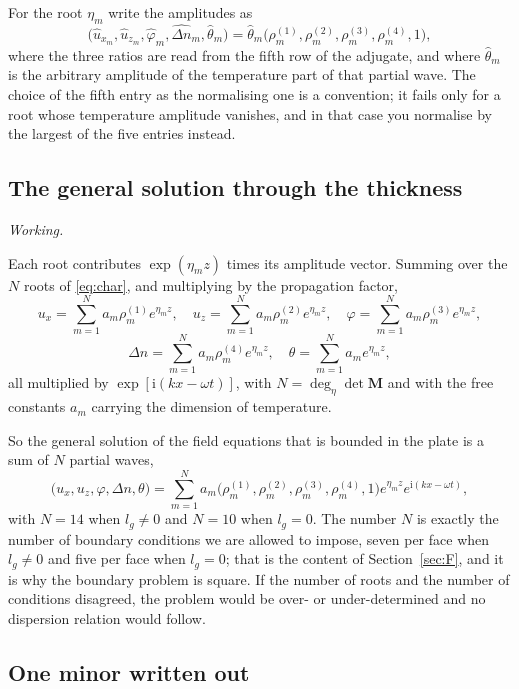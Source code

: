 \documentclass[11pt,a4paper]{article}
\newif\ifshowworked \showworkedtrue
\newenvironment{worked}{\ifshowworked\par\smallskip\noindent\textit{Working.}\par\else\setbox0\vbox\bgroup\fi}{\ifshowworked\par\smallskip\else\egroup\fi}
\newcommand{\ii}{\mathrm{i}}
\newcommand{\bx}{\hat u_x}
\newcommand{\bz}{\hat u_z}
\newcommand{\bp}{\hat\varphi}
\newcommand{\bn}{\widehat{\Delta n}}
\newcommand{\bt}{\hat\theta}
\begin{document}
\noindent For the root $\eta_m$ write the amplitudes as
\begin{equation}\label{eq:ratio}
\bigl(\bx_m,\bz_m,\bp_m,\bn_m,\bt_m\bigr)=\bt_m\bigl(\rho^{(1)}_m,\rho^{(2)}_m,\rho^{(3)}_m,\rho^{(4)}_m,1\bigr),
\end{equation}
where the three ratios are read from the fifth row of the adjugate, and where $\bt_m$ is the arbitrary
amplitude of the temperature part of that partial wave. The choice of the fifth entry as the normalising one
is a convention; it fails only for a root whose temperature amplitude vanishes, and in that case you
normalise by the largest of the five entries instead.

\subsection{The general solution through the thickness}

\begin{worked}
Each root contributes $\exp(\eta_m z)$ times its amplitude vector. Summing over the $N$ roots of
\eqref{eq:char}, and multiplying by the propagation factor,
\[
u_x=\sum_{m=1}^{N}a_m\rho^{(1)}_m e^{\eta_m z},\quad
u_z=\sum_{m=1}^{N}a_m\rho^{(2)}_m e^{\eta_m z},\quad
\varphi=\sum_{m=1}^{N}a_m\rho^{(3)}_m e^{\eta_m z},
\]
\[
\Delta n=\sum_{m=1}^{N}a_m\rho^{(4)}_m e^{\eta_m z},\quad
\theta=\sum_{m=1}^{N}a_m e^{\eta_m z},
\]
all multiplied by $\exp[\ii(kx-\omega t)]$, with $N=\deg_\eta\det\mathbf M$ and with the free constants
$a_m$ carrying the dimension of temperature.
\end{worked}

\noindent So the general solution of the field equations that is bounded in the plate is a sum of $N$
partial waves,
\begin{equation}\label{eq:general}
\bigl(u_x,u_z,\varphi,\Delta n,\theta\bigr)
=\sum_{m=1}^{N}a_m\bigl(\rho^{(1)}_m,\rho^{(2)}_m,\rho^{(3)}_m,\rho^{(4)}_m,1\bigr)
e^{\eta_m z}e^{\ii(kx-\omega t)},
\end{equation}
with $N=14$ when $l_g\ne0$ and $N=10$ when $l_g=0$. The number $N$ is exactly the number of boundary
conditions we are allowed to impose, seven per face when $l_g\ne0$ and five per face when $l_g=0$; that is
the content of Section~\ref{sec:F}, and it is why the boundary problem is square. If the number of roots and
the number of conditions disagreed, the problem would be over- or under-determined and no dispersion
relation would follow.

\subsection{One minor written out}
\end{document}

